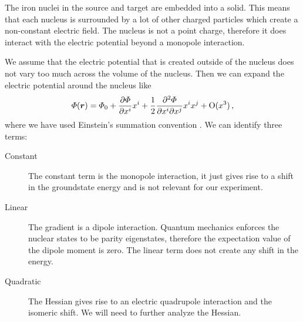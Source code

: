 \documentclass[11pt, english, fleqn, DIV=15, headinclude, BCOR=2cm]{scrreprt}
\begin{document}
The iron nuclei in the source and target are embedded into a solid. This means
that each nucleus is surrounded by a lot of other charged particles which
create a non-constant electric field. The nucleus is not a point charge,
therefore it does interact with the electric potential beyond a monopole
interaction.

We assume that the electric potential that is created outside of the nucleus
does not vary too much across the volume of the nucleus. Then we can expand the
electric potential around the nucleus like
\[
    \Phi(\vec r) = \Phi_0 + \pd{\Phi}{x^i} x^i
    + \frac12 \frac{\partial^2 \Phi}{\partial x^i \partial x^j} x^i x^j +
    \mathrm O(x^3) \,,
\]
where we have used Einstein's summation convention
\parencite[(3.19)]{Schatz/Nukleare_Festkoerperphysik}. We can identify three
terms:

\begin{description}
    \item[Constant]
        The constant term is the monopole interaction, it just gives rise to a
        shift in the groundstate energy and is not relevant for our experiment.

    \item[Linear]
        The gradient is a dipole interaction. Quantum mechanics enforces the
        nuclear states to be parity eigenstates, therefore the expectation
        value of the dipole moment is zero. The linear term does not create any
        shift in the energy.

    \item[Quadratic]
        The Hessian gives rise to an electric quadrupole interaction and the
        isomeric shift. We will need to further analyze the Hessian.
\end{description}
\end{document}

